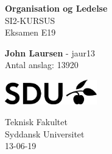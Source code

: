 \documentclass{article}
\begin{document}
\begin{titlepage}
    \begin{center}
        \vspace*{1cm}
        
        {\huge \textbf{Organisation og Ledelse}}
        \\SI2-KURSUS
        \\\vspace{0.5cm}
        Eksamen E19
        
        \vspace{1.5cm}
        
        \textbf{John Laursen} - jaur13 \\
        \vspace{2cm}
        Antal anslag: 13920
        \vspace{12cm}
        
        \hspace*{1.9cm}
        \includegraphics[width=0.3\textwidth]{assets/SDU_BLACK_RGB.png}
        
        Teknisk Fakultet \\
        Syddansk Universitet\\
        13-06-19
    \end{center}
\end{titlepage}
\tableofcontents
\newpage

\clearpage


\newpage
\printbibliography[title = {Kilder}]
\end{document}

